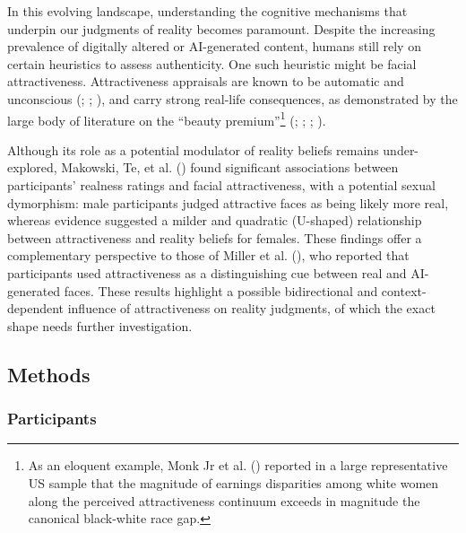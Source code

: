 \documentclass[
  jou,
  floatsintext,
  longtable,
  nolmodern,
  notxfonts,
  notimes,
  colorlinks=true,linkcolor=blue,citecolor=blue,urlcolor=blue]{apa7}
\begin{document}
In this evolving landscape, understanding the cognitive mechanisms that
underpin our judgments of reality becomes paramount. Despite the
increasing prevalence of digitally altered or AI-generated content,
humans still rely on certain heuristics to assess authenticity. One such
heuristic might be facial attractiveness. Attractiveness appraisals are
known to be automatic and unconscious (; ;
), and carry strong
real-life consequences, as demonstrated by the large body of literature
on the ``beauty premium''\footnote{As an eloquent example, Monk Jr et
  al. () reported in a large
  representative US sample that the magnitude of earnings disparities
  among white women along the perceived attractiveness continuum exceeds
  in magnitude the canonical black-white race gap.}
(;
;
;
).

Although its role as a potential modulator of reality beliefs remains
under-explored, Makowski, Te, et al.
() found significant associations
between participants' realness ratings and facial attractiveness, with a
potential sexual dymorphism: male participants judged attractive faces
as being likely more real, whereas evidence suggested a milder and
quadratic (U-shaped) relationship between attractiveness and reality
beliefs for females. These findings offer a complementary perspective to
those of Miller et al. (), who reported
that participants used attractiveness as a distinguishing cue between
real and AI-generated faces. These results highlight a possible
bidirectional and context-dependent influence of attractiveness on
reality judgments, of which the exact shape needs further investigation.

\subsection{Methods}\label{methods-1}

\subsubsection{Participants}\label{participants-1}
\end{document}
